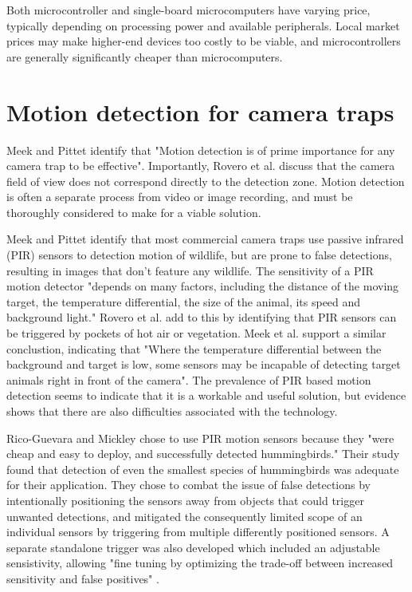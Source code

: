 \documentclass[class=report,11pt,crop=false]{standalone}
\begin{document}
Both microcontroller and single-board microcomputers have varying price, typically depending on processing power and available peripherals. Local market prices may make higher-end devices too costly to be viable, and microcontrollers are generally significantly cheaper than microcomputers.

\section{Motion detection for camera traps}

Meek and Pittet \cite{meek2012user} identify that "Motion detection is of prime importance for any camera trap to be effective". Importantly, Rovero et al. \cite{rovero2013which} discuss that the camera field of view does not correspond directly to the detection zone. Motion detection is often a separate process from video or image recording, and must be thoroughly considered to make for a viable solution.

Meek and Pittet \cite{meek2012user} identify that most commercial camera traps use passive infrared (PIR) sensors to detection motion of wildlife, but are prone to false detections, resulting in images that don't feature any wildlife. The sensitivity of a PIR motion detector "depends on many factors, including the distance of the moving target, the temperature differential, the size of the animal, its speed and background light." Rovero et al. \cite{rovero2013which} add to this by identifying that PIR sensors can be triggered by pockets of hot air or vegetation. Meek et al. \cite{meek2012introduction} support a similar conclustion, indicating that "Where the temperature differential between the background and target is low, some sensors may be incapable of detecting target animals right in front of the camera". The prevalence of PIR based motion detection seems to indicate that it is a workable and useful solution, but evidence shows that there are also difficulties associated with the technology.

Rico-Guevara and Mickley \cite{rico-guevara2017bring} chose to use PIR motion sensors because they "were cheap and easy to deploy, and successfully detected hummingbirds." Their study found that detection of even the smallest species of hummingbirds was adequate for their application. They chose to combat the issue of false detections by intentionally positioning the sensors away from objects that could trigger unwanted detections, and mitigated the consequently limited scope of an individual sensors by triggering from multiple differently positioned sensors. A separate standalone trigger was also developed which included an adjustable sensistivity, allowing "fine tuning by optimizing the trade-off between increased sensitivity and false positives" \cite{rico-guevara2017bring}.
\end{document}
